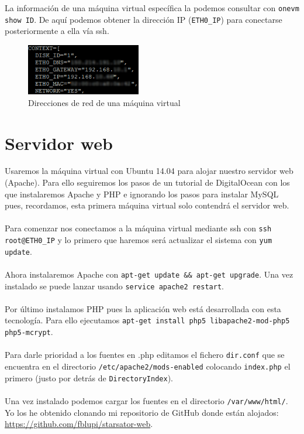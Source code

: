 La información de una máquina virtual específica la podemos consultar con \texttt{onevm show ID}. De aquí podemos obtener la dirección IP (\texttt{ETH0\_IP}) para conectarse posteriormente a ella vía ssh.

\begin{figure}[H]
	\centering
	\includegraphics[width=5cm]{img/onevm-show-context}
	\caption{Direcciones de red de una máquina virtual}
	\label{fig:onevm-show-context}
\end{figure}

\section{Servidor web}

Usaremos la máquina virtual con Ubuntu 14.04 para alojar nuestro servidor web (Apache). Para ello seguiremos los pasos de un tutorial de DigitalOcean \cite{InstallLAMPUbuntu14.04} con los que instalaremos Apache y PHP e ignorando los pasos para instalar MySQL pues, recordamos, esta primera máquina virtual solo contendrá el servidor web.
\\ \\
Para comenzar nos conectamos a la máquina virtual mediante ssh con \texttt{ssh root@ETH0\_IP} y lo primero que haremos será actualizar el sistema con \texttt{yum update}.
\\ \\
Ahora instalaremos Apache con \texttt{apt-get update \&\& apt-get upgrade}. Una vez instalado se puede lanzar usando \texttt{service apache2 restart}.
\\ \\
Por último instalamos PHP pues la aplicación web está desarrollada con esta tecnología. Para ello ejecutamos \texttt{apt-get install php5 libapache2-mod-php5 php5-mcrypt}.
\\ \\
Para darle prioridad a los fuentes en .php editamos el fichero \texttt{dir.conf} que se encuentra en el directorio \texttt{/etc/apache2/mods-enabled} colocando \texttt{index.php} el primero (justo por detrás de \texttt{DirectoryIndex}).
\\ \\
Una vez instalado podemos cargar los fuentes en el directorio \texttt{/var/www/html/}. Yo los he obtenido clonando mi repositorio de GitHub donde están alojados: \url{https://github.com/fblupi/starsator-web}.

